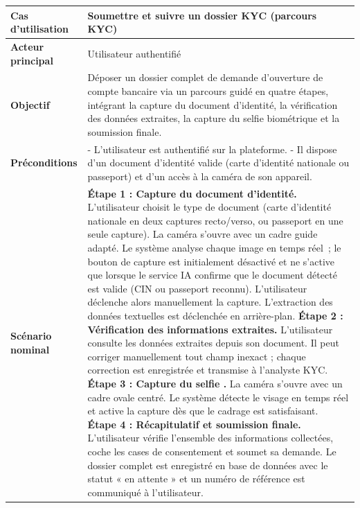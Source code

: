 \begin{longtable}{|>{\bfseries}p{3.8cm}|p{10.2cm}|}
  \hline
  Cas d'utilisation    & Soumettre et suivre un dossier KYC (parcours KYC) \\
  \hline
  Acteur principal     & Utilisateur authentifié \\
  \hline
  Objectif             & Déposer un dossier complet de demande d'ouverture de compte bancaire via un parcours guidé en quatre étapes, intégrant la capture du document d'identité, la vérification des données extraites, la capture du selfie biométrique et la soumission finale. \\
  \hline
  Préconditions        &
    - L'utilisateur est authentifié sur la plateforme. \newline
    - Il dispose d'un document d'identité valide (carte d'identité nationale ou passeport) et d'un accès à la caméra de son appareil. \\
  \hline
  Scénario nominal     &
    \textbf{Étape 1 : Capture du document d'identité.} L'utilisateur choisit le type de document (carte d'identité nationale en deux captures recto/verso, ou passeport en une seule capture). La caméra s'ouvre avec un cadre guide adapté. Le système analyse chaque image en temps réel~; le bouton de capture est initialement désactivé et ne s'active que lorsque le service IA confirme que le document détecté est valide (CIN ou passeport reconnu). L'utilisateur déclenche alors manuellement la capture. L'extraction des données textuelles est déclenchée en arrière-plan. \newline\newline
    \textbf{Étape 2 : Vérification des informations extraites.} L'utilisateur consulte les données extraites depuis son document. Il peut corriger manuellement tout champ inexact ; chaque correction est enregistrée et transmise à l'analyste KYC. \newline\newline
    \textbf{Étape 3 : Capture du selfie .} La caméra s'ouvre avec un cadre ovale centré. Le système détecte le visage en temps réel et active la capture dès que le cadrage est satisfaisant. \newline\newline
    \textbf{Étape 4 : Récapitulatif et soumission finale.} L'utilisateur vérifie l'ensemble des informations collectées, coche les cases de consentement et soumet sa demande. Le dossier complet est enregistré en base de données avec le statut « en attente » et un numéro de référence est communiqué à l'utilisateur. \\

\end{longtable}
